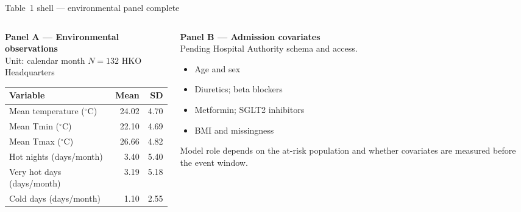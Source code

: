 \documentclass[aspectratio=169,10pt]{beamer}
\begin{document}
\begin{frame}{Table~1 shell --- environmental panel complete}
  \begin{columns}[T]
    \begin{column}{0.54\textwidth}
      {\color{Ink}\textbf{Panel A --- Environmental observations}}\\[0.12em]
      {\footnotesize Unit: calendar month \quad $N=132$ \quad HKO Headquarters}

      \vspace{0.35em}
      \footnotesize
      \begin{tabular}{@{}lrr@{}}
        \toprule
        Variable & Mean & SD \\
        \midrule
        Mean temperature ($^\circ$C) & 24.02 & 4.70 \\
        Mean Tmin ($^\circ$C) & 22.10 & 4.69 \\
        Mean Tmax ($^\circ$C) & 26.66 & 4.82 \\
        Hot nights (days/month) & 3.40 & 5.40 \\
        Very hot days (days/month) & 3.19 & 5.18 \\
        Cold days (days/month) & 1.10 & 2.55 \\
        \bottomrule
      \end{tabular}
    \end{column}
    \begin{column}{0.44\textwidth}
      {\color{Ink}\textbf{Panel B --- Admission covariates}}\\[0.12em]
      {\footnotesize Pending Hospital Authority schema and access.}

      \vspace{0.35em}
      \footnotesize
      \begin{itemize}
        \item Age and sex
        \item Diuretics; beta blockers
        \item Metformin; SGLT2 inhibitors
        \item BMI and missingness
      \end{itemize}

      \vspace{0.45em}
      {\footnotesize Model role depends on the at-risk population and whether covariates are measured before the event window.}
    \end{column}
  \end{columns}
\end{frame}
\end{document}

